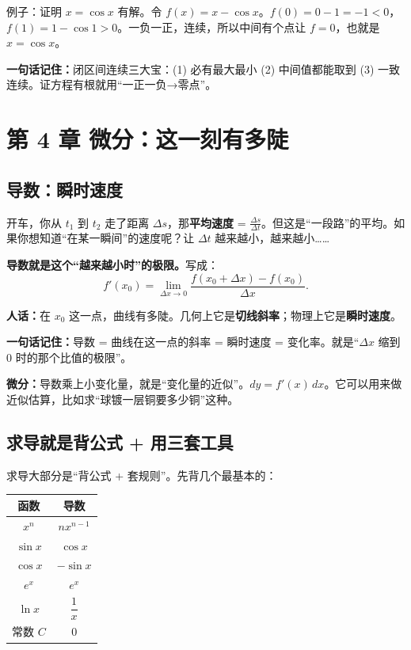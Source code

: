 ﻿\documentclass[11pt,a4paper,UTF8]{ctexart}
\newcommand{\idea}[1]{\par\smallskip\noindent\colorbox{yellow!22}{\textbf{一句话记住：}#1}\par\smallskip}
\begin{document}
例子：证明 $x=\cos x$ 有解。令 $f(x)=x-\cos x$。$f(0)=0-1=-1<0$，$f(1)=1-\cos1>0$。一负一正，连续，所以中间有个点让 $f=0$，也就是 $x=\cos x$。

\idea{闭区间连续三大宝：(1) 必有最大最小 (2) 中间值都能取到 (3) 一致连续。证方程有根就用“一正一负→零点”。}

\section{第 4 章 微分：这一刻有多陡}

\subsection{导数：瞬时速度}

开车，你从 $t_1$ 到 $t_2$ 走了距离 $\Delta s$，那\textbf{平均速度} = $\frac{\Delta s}{\Delta t}$。但这是“一段路”的平均。如果你想知道“在某一瞬间”的速度呢？让 $\Delta t$ 越来越小，越来越小……

\textbf{导数就是这个“越来越小时”的极限。}写成：
$$f'(x_0)=\lim_{\Delta x\to0}\frac{f(x_0+\Delta x)-f(x_0)}{\Delta x}.$$

\textbf{人话：}在 $x_0$ 这一点，曲线有多陡。几何上它是\textbf{切线斜率}；物理上它是\textbf{瞬时速度}。

\idea{导数 = 曲线在这一点的斜率 = 瞬时速度 = 变化率。就是“$\Delta x$ 缩到 0 时的那个比值的极限”。}

\textbf{微分：}导数乘上小变化量，就是“变化量的近似”。$dy=f'(x)\,dx$。它可以用来做近似估算，比如求“球镀一层铜要多少铜”这种。

\subsection{求导就是背公式 + 用三套工具}

求导大部分是“背公式 + 套规则”。先背几个最基本的：

\begin{center}
\begin{tabular}{c|c}
函数 & 导数\\\hline
$x^n$ & $n x^{n-1}$\\
$\sin x$ & $\cos x$\\
$\cos x$ & $-\sin x$\\
$e^x$ & $e^x$\\
$\ln x$ & $\dfrac1x$\\
常数 $C$ & $0$
\end{tabular}
\end{center}
\end{document}
